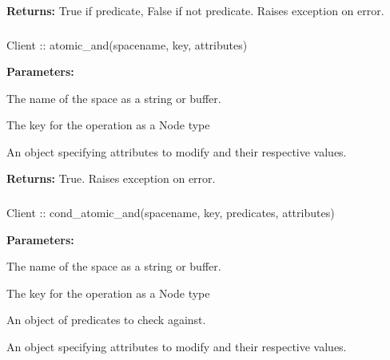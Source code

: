 \noindent\textbf{Returns:}
True if predicate, False if not predicate.  Raises exception on error.

\subsubsection{}
\label{api:nodejs:atomic_and}
\begin{javascriptcode}
Client :: atomic_and(spacename, key, attributes)
\end{javascriptcode}
\funcdesc 

\noindent\textbf{Parameters:}
\begin{description}[labelindent=\widthof{{\code{attributes}}},leftmargin=*,noitemsep,nolistsep,align=right]
\item[\code{spacename}] The name of the space as a string or buffer.
\item[\code{key}] The key for the operation as a Node type
\item[\code{attributes}] An object specifying attributes to modify and their respective values.
\end{description}

\noindent\textbf{Returns:}
True.  Raises exception on error.

\subsubsection{}
\label{api:nodejs:cond_atomic_and}
\begin{javascriptcode}
Client :: cond_atomic_and(spacename, key, predicates, attributes)
\end{javascriptcode}
\funcdesc 

\noindent\textbf{Parameters:}
\begin{description}[labelindent=\widthof{{\code{predicates}}},leftmargin=*,noitemsep,nolistsep,align=right]
\item[\code{spacename}] The name of the space as a string or buffer.
\item[\code{key}] The key for the operation as a Node type
\item[\code{predicates}] An object of predicates to check against.
\item[\code{attributes}] An object specifying attributes to modify and their respective values.
\end{description}

